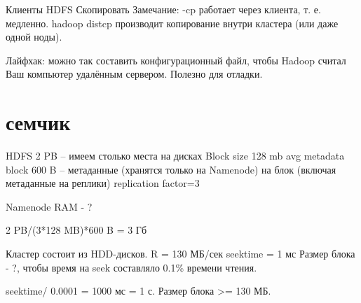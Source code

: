 Клиенты HDFS
Скопировать
Замечание: -cp работает через клиента, т. е. медленно. hadoop distcp производит копирование внутри кластера (или даже одной ноды). 

Лайфхак: можно так составить конфигурационный файл, чтобы Hadoop считал Ваш компьютер удалённым сервером. Полезно для отладки.


\section{семчик}
HDFS 2 PB -- имеем столько места на дисках
Block size 128 mb
avg metadata block 600 B -- метаданные (хранятся только на Namenode) на блок (включая метаданные на реплики)
replication factor=3

Namenode RAM - ?

2 PB/(3*128 MB)*600 B = 3 Гб



Кластер состоит из HDD-дисков. 
R = 130 МБ/сек
seektime = 1 мс
Размер блока - ?, чтобы время на seek составляло 0.1\% времени чтения.

seektime/ 0.0001 = 1000 мс = 1 с.
Размер блока >= 130 МБ.




